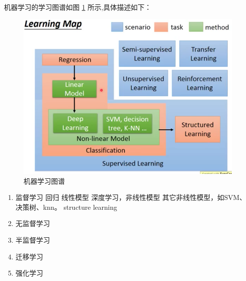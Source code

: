 机器学习的学习图谱如图 \ref{fig:ml_map} 所示,具体描述如下：

\begin{figure}[ht]
	\centering
	\includegraphics[scale=0.4]{./pic/learning_map.png}
	\caption{机器学习图谱}
	\label{fig:ml_map}
\end{figure}
	
\begin{enumerate}
	\item 监督学习
		\subitem 回归
		\subitem 线性模型
		\subitem 深度学习，非线性模型
		\subitem 其它非线性模型，如SVM、决策树、knn。
		\subitem structure learning
	\item 无监督学习
	\item 半监督学习
	\item 迁移学习
	\item 强化学习

\end{enumerate}

